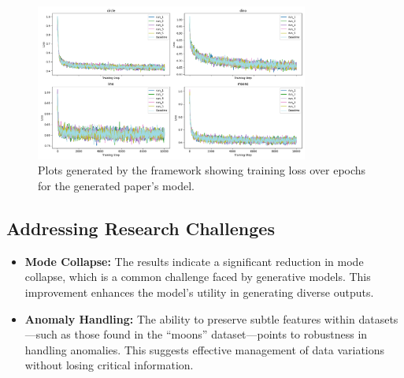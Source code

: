 \begin{figure}
    \centering
    \includegraphics[width=0.8\textwidth, height=0.7\textwidth]{images/train_loss.png}
    \caption{Plots generated by the framework showing training loss over epochs for the generated paper's model.}
    \label{fig:output_b} %
\end{figure}

\subsection{Addressing Research Challenges}
\begin{itemize}
    \item \textbf{Mode Collapse:} The results indicate a significant reduction in mode collapse, which is a common challenge faced by generative models. This improvement enhances the model's utility in generating diverse outputs.
    \item \textbf{Anomaly Handling:} The ability to preserve subtle features within datasets—such as those found in the ``moons'' dataset—points to robustness in handling anomalies. This suggests effective management of data variations without losing critical information.
\end{itemize}




